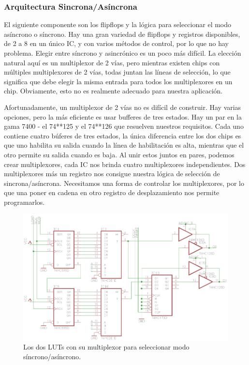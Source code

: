 \documentclass[12pt]{article}
\begin{document}
\subsubsection{Arquitectura Sincrona/Asíncrona}

El siguiente componente son los flipflops y la lógica para seleccionar el modo asíncrono o síncrono. Hay una gran variedad de flipflops y registros disponibles, de 2 a 8 en un único IC, y con varios métodos de control, por lo que no hay problema. Elegir entre síncrono y asincrónico es un poco más difícil. La elección natural aquí es un multiplexor de 2 vías, pero mientras existen chips con múltiples multiplexores de 2 vías, todas juntan las líneas de selección, lo que significa que debe elegir la misma entrada para todos los multiplexores en un chip. Obviamente, esto no es realmente adecuado para nuestra aplicación.

Afortunadamente, un multiplexor de 2 vías no es difícil de construir. Hay varias opciones, pero la más eficiente es usar bufferes de tres estados. Hay un par en la gama 7400 - el 74**125 y el 74**126 que resuelven nuestros requisitos. Cada uno contiene cuatro búferes de tres estados, la única diferencia entre los dos chips es que uno habilita su salida cuando la línea de habilitación es alta, mientras que el otro permite su salida cuando es baja. Al unir estos juntos en pares, podemos crear multiplexores, cada IC nos brinda cuatro multiplexores independientes. Dos multiplexores más un registro nos consigue nuestra lógica de selección de sincrona/asíncrona. Necesitamos una forma de controlar los multiplexores, por lo que una poner en cadena en otro registro de desplazamiento nos permite programarlos. 

\begin{figure}[H]
  \centering
  \includegraphics[width=\textwidth]{9-lut-mux.png}
  \caption{Los dos LUTs con su multiplexor para seleccionar modo síncrono/asíncrono.}
  \label{fig:6}
\end{figure}
\end{document}
